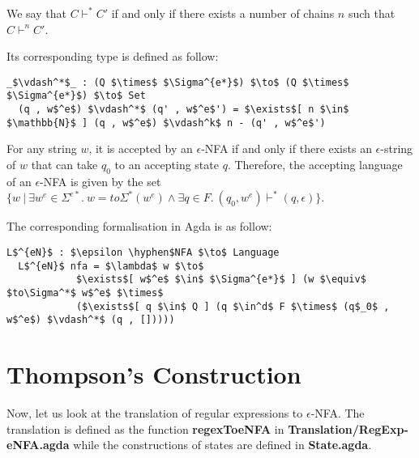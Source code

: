 \begin{defn}
\noindent We say that \(C \vdash^* C'\) if and only
if there exists a number of chains \(n\) such that \(C \vdash^n C'\). 
\end{defn}

\par Its corresponding type is defined as follow: 
\begin{lstlisting}[mathescape=true,xleftmargin=.1\textwidth]
  _$\vdash^*$_ : (Q $\times$ $\Sigma^{e*}$) $\to$ (Q $\times$ $\Sigma^{e*}$) $\to$ Set
  (q , w$^e$) $\vdash^*$ (q' , w$^e$') = $\exists$[ n $\in$ $\mathbb{N}$ ] (q , w$^e$) $\vdash^k$ n - (q' , w$^e$')
\end{lstlisting}

\begin{defn}
\label{defn:enfa}
\noindent For any string \(w\), it is accepted by an \(\epsilon\)-NFA
if and only if there exists an \(\epsilon\)-string of \(w\)
that can take \(q_0\) to an accepting state \(q\). Therefore, the
accepting language of an \(\epsilon\)-NFA is given by the set \(\{w\ |\ \exists w^e\in
\Sigma^{e*}.\ w = to\Sigma^*(w^e) \wedge \exists q\in F.\ (q_0,w^e) \vdash^* (q,\epsilon)\}\). 
\end{defn}

\par The corresponding formalisation in Agda is as follow: 
\begin{lstlisting}[mathescape=true,xleftmargin=.1\textwidth]
  L$^{eN}$ : $\epsilon \hyphen$NFA $\to$ Language
  L$^{eN}$ nfa = $\lambda$ w $\to$ 
            $\exists$[ w$^e$ $\in$ $\Sigma^{e*}$ ] (w $\equiv$ $to\Sigma^*$ w$^e$ $\times$ 
            ($\exists$[ q $\in$ Q ] (q $\in^d$ F $\times$ (q$_0$ , w$^e$) $\vdash^*$ (q , []))))
\end{lstlisting}

\section{Thompson's Construction}
\par Now, let us look at the translation of regular expressions to
\(\epsilon\)-NFA. The translation is defined as the function
\textbf{regexToeNFA} in \textbf{Translation/RegExp-eNFA.agda} while
the constructions of states are defined in \textbf{State.agda}. 

